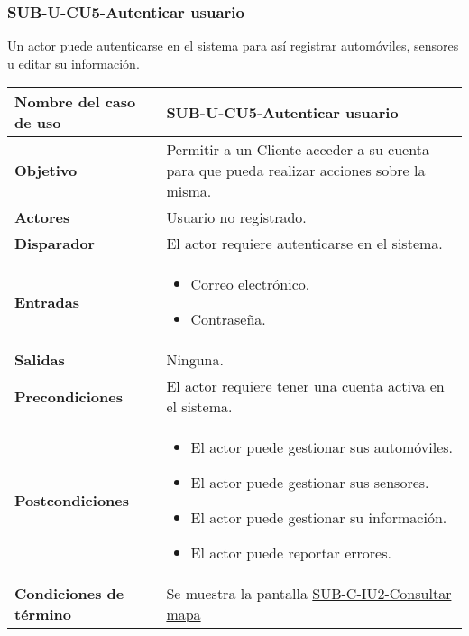 \subsubsection{SUB-U-CU5-Autenticar usuario}\label{SUB-U-CU5}
Un actor puede autenticarse en el sistema para así registrar automóviles, sensores u editar su información.

\begin{longtable}{|J{5cm}|J{10.3cm}|}
	\hline
	\textbf{Nombre del caso de uso} &
		SUB-U-CU5-Autenticar usuario \\ \hline
	\textbf{Objetivo} &
		Permitir a un Cliente acceder a su cuenta para que pueda realizar acciones sobre la misma. \\ \hline
	\textbf{Actores} &
		Usuario no registrado. \\ \hline 
	\textbf{Disparador} & 
		El actor requiere autenticarse en el sistema. \\ \hline 
	\textbf{Entradas} & 
		\begin{itemize}
				\item Correo electrónico.
				\item Contraseña.
		\end{itemize}\\ \hline 
	\textbf{Salidas} & Ninguna.
		\\ \hline
	\textbf{Precondiciones} &
		El actor requiere tener una cuenta activa en el sistema.\\ \hline
	\textbf{Postcondiciones} &
		\begin{itemize}
			\item El actor puede gestionar sus automóviles.
			\item El actor puede gestionar sus sensores.
			\item El actor puede gestionar su información.
			\item El actor puede reportar errores.
		\end{itemize} \\ \hline
	\textbf{Condiciones de término} & Se muestra la pantalla \hyperref[fig:sub-c-iu2]{SUB-C-IU2-Consultar mapa}

\end{longtable}
